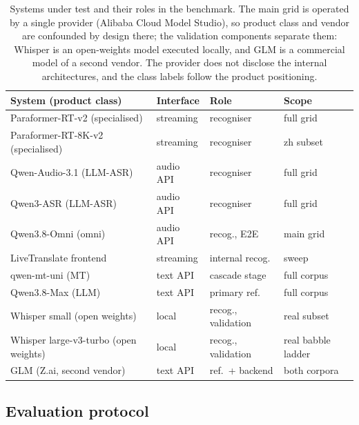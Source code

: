 \begin{table}[t]
\centering
\caption{Systems under test and their roles in the benchmark. The main grid
is operated by a single provider (Alibaba Cloud Model Studio), so product
class and vendor are confounded by design there; the validation components
separate them: Whisper is an open-weights model executed locally, and GLM is
a commercial model of a second vendor. The provider does not disclose
the internal architectures, and the class labels follow the product
positioning.}
\label{tab:systems}
\footnotesize
\setlength{\tabcolsep}{4pt}
\begin{tabular}{llll}
\toprule
System (product class) & Interface & Role & Scope \\
\midrule
Paraformer-RT-v2 (specialised) & streaming & recogniser & full grid \\
Paraformer-RT-8K-v2 (specialised) & streaming & recogniser & zh subset \\
Qwen-Audio-3.1 (LLM-ASR) & audio API & recogniser & full grid \\
Qwen3-ASR (LLM-ASR) & audio API & recogniser & full grid \\
Qwen3.8-Omni (omni) & audio API & recog., E2E & main grid \\
LiveTranslate frontend & streaming & internal recog. & sweep \\
qwen-mt-uni (MT) & text API & cascade stage & full corpus \\
Qwen3.8-Max (LLM) & text API & primary ref. & full corpus \\
\midrule
Whisper small (open weights) & local & recog., validation & real subset \\
Whisper large-v3-turbo (open weights) & local & recog., validation & real babble ladder \\
GLM (Z.ai, second vendor) & text API & ref.\ + backend & both corpora \\
\bottomrule
\end{tabular}
\end{table}

\subsection{Evaluation protocol}

